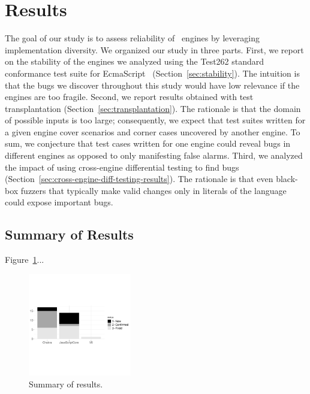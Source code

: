 \documentclass[10pt,conference,anonymous]{IEEEtran}
\begin{document}
\section{Results}
\label{sec:results}

The goal of our study is to assess reliability of \js\ engines by
leveraging implementation diversity. We organized our study in three
parts. First, we report on the stability of the engines we analyzed
using the Test262 standard conformance test suite for
EcmaScript~\cite{ecma262-conformance-suite}
(Section~\ref{sec:stability}). The intuition is that the bugs we
discover throughout this study would have low relevance if the engines
are too fragile. Second, we report results obtained with test
transplantation (Section~\ref{sec:transplantation}). The rationale is
that the domain of possible inputs is too large; consequently, we
expect that test suites written for a given engine cover scenarios and
corner cases uncovered by another engine. To sum, we conjecture that
test cases written for one engine could reveal bugs in different
engines as opposed to only manifesting false alarms. Third, we
analyzed the impact of using cross-engine differential testing to find
bugs (Section~\ref{sec:cross-engine-diff-testing-results}). The
rationale is that even black-box fuzzers that typically make valid
changes only in literals of the language could expose important
bugs.

\subsection{Summary of Results}
\label{sec:summary}

Figure~\ref{fig:summary}...

\begin{figure}[h]
  \centering
  \includegraphics[trim=0 120 0 150,clip,width=0.4\textwidth,scale=0.3]{R/stackedbar/stacked}  
  \caption{\label{fig:summary}Summary of results.}
\end{figure}
\end{document}
